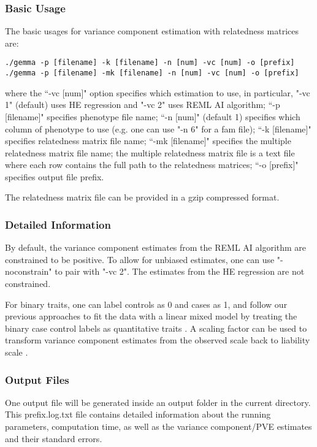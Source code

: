 \documentclass[11pt]{article}
\begin{document}
\subsubsection{Basic Usage}
The basic usages for variance component estimation with relatedness matrices are:
\begin{verbatim}
./gemma -p [filename] -k [filename] -n [num] -vc [num] -o [prefix]
./gemma -p [filename] -mk [filename] -n [num] -vc [num] -o [prefix]
\end{verbatim}
where the ``-vc [num]" option specifies which estimation to use, in particular, "-vc 1" (default) uses HE regression and "-vc 2" uses REML AI algorithm; ``-p [filename]" specifies phenotype file name; ``-n [num]" (default 1) specifies which column of phenotype to use (e.g. one can use "-n 6" for a fam file); ``-k [filename]" specifies relatedness matrix file name; ``-mk [filename]" specifies the multiple relatedness matrix file name; the multiple relatedness matrix file is a text file where each row contains the full path to the relatedness matrices; ``-o [prefix]" specifies output file prefix. 

The relatedness matrix file can be provided in a gzip compressed format.



\subsubsection{Detailed Information}
By default, the variance component estimates from the REML AI algorithm are constrained to be positive. To allow for unbiased estimates, one can use "-noconstrain" to pair with "-vc 2". The estimates from the HE regression are not constrained. 

For binary traits, one can label controls as 0 and cases as 1, and follow our previous approaches to fit the data with a linear mixed model by treating the binary case control labels as quantitative traits \cite{Zhou:2013}. A scaling factor can be used to transform variance component estimates from the observed scale back to liability scale \cite{Zhou:2013}.


\subsubsection{Output Files}
One output file will be generated inside an output folder in the current directory. This prefix.log.txt file contains detailed information about the running parameters, computation time, as well as the variance component/PVE estimates and their standard errors.
\end{document}
